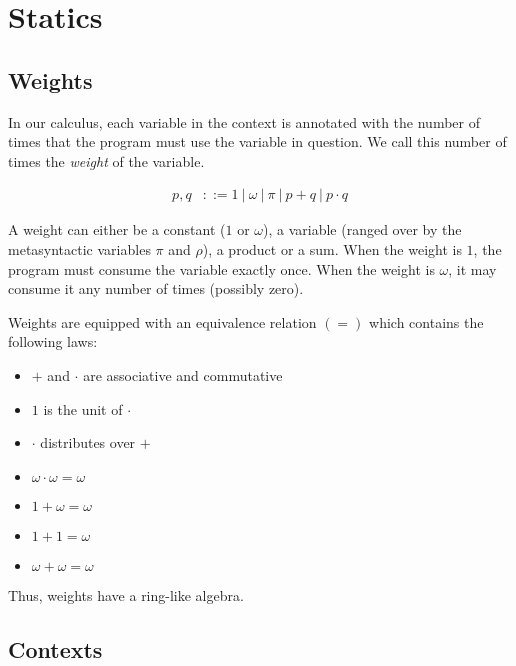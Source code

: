 \documentclass[11pt]{article}
\begin{document}


\section{Statics}
\label{sec:orgheadline8}
\subsection{Weights}

In our calculus, each variable in the context is annotated with the
number of times that the program must use the variable in question.
We call this number of times the \emph{weight} of the variable.

\begin{align*}
  p,q &::= 1 ~|~ ω ~|~ π ~|~ p+q ~|~ p·q
\end{align*}

A weight can either be a constant ($1$ or $ω$), a variable (ranged
over by the metasyntactic variables \(π\) and \(ρ\)), a product or a
sum.  When the weight is $1$, the program must consume the variable
exactly once. When the weight is $ω$, it may consume it any number of
times (possibly zero).

Weights are equipped with an equivalence relation $(=)$ which contains
the following laws:

\begin{itemize}
\item $+$ and $·$ are associative and commutative
\item $1$ is the unit of $·$
\item $·$ distributes over $+$
\item $ω · ω = ω$
\item $1 + ω = ω$
\item $1 + 1 = ω$
\item $ω + ω = ω$
\end{itemize}

Thus, weights have a ring-like algebra.

\subsection{Contexts}
\end{document}
